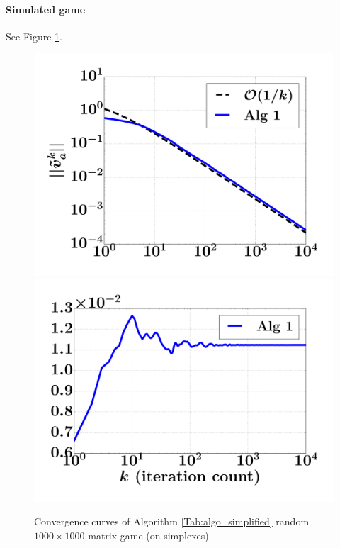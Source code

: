 \documentclass{article} %
\begin{document}
\paragraph{Simulated game}
See Figure \ref{Tab:sim_dgap_curve}.

\begin{figure}
  \includegraphics[width=1\linewidth]{simplex_dgap.pdf}
  \includegraphics[width=1\linewidth]{simplex_NE.pdf}
  \caption{Convergence curves of Algorithm \ref{Tab:algo_simplified} random $1000 \times 1000$ matrix game (on simplexes)}
  \label{Tab:sim_dgap_curve}
\end{figure}
\end{document}
